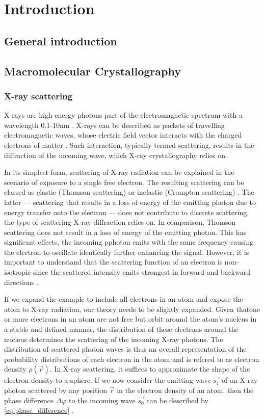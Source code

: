 \section{Introduction}

\subsection{General introduction}

\subsection{Macromolecular Crystallography}

\subsubsection{X-ray scattering}

X-rays are high energy photons part of the electromagnetic spectrum with a wavelength 0.1-10nm \cite{Rupp2010-nc}. X-rays can be described as packets of travelling electromagnetic waves, whose electric field vector interacts with the charged electrons of matter \cite{Rupp2010-nc}. Such interaction, typically termed scattering, results in the diffraction of the incoming wave, which X-ray crystallography relies on.

In its simplest form, scattering of X-ray radiation can be explained in the scenario of exposure to a single free electron. The resulting scattering can be classed as elastic (Thomson scattering) or inelastic (Crompton scattering) \cite{Rupp2010-nc}. The latter --- scattering that results in a loss of energy of the emitting photon due to energy transfer onto the electron --- does not contribute to discrete scattering, the type of scattering X-ray diffraction relies on. In comparison, Thomson scattering does not result in a loss of energy of the emitting photon. This has significant effects, the incoming pphoton emits with the same frequency causing the electron to oscillate identically further enhancing the signal. However, it is important to understand that the scattering function of an electron is non-isotropic since the scattered intensity emits strongest in forward and backward directions \cite{Rupp2010-nc}.

If we expand the example to include all electrons in an atom and expose the atom to X-ray radiation, our theory needs to be slightly expanded. Given thatone or more electrons in an atom are not free but orbit around the atom's nucleus in a stable and defined manner, the distribution of these electrons around the nucleus determines the scattering of the incoming X-ray photons. The distribution of scattered photon waves is thus an overall representation of the probability distributions of each electron in the atom and is refered to as electron density $\rho(\vec{r})$. In X-ray scattering, it suffices to approximate the shape of the electron density to a sphere. If we now consider the emitting wave $\vec{s_1}$ of an X-ray photon scattered by any position $\vec{r}$ in the electron density of an atom, then the phase difference $\Delta\varphi$ to the incoming wave $\vec{s_0}$ can be described by \cref{eq:phase_difference} \cite{Rupp2010-nc}. 

